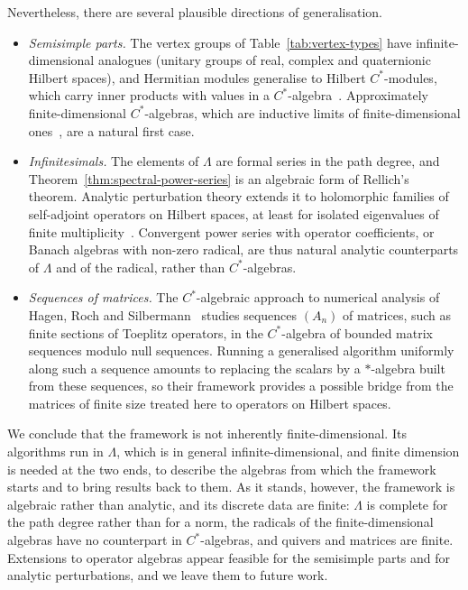 \documentclass[12pt, a4paper]{report}
\theoremstyle{plain}
\theoremstyle{definition}
\theoremstyle{remark}
\theoremstyle{plain}
\begin{document}
Nevertheless, there are several plausible directions of generalisation.
\begin{itemize}
  \item \emph{Semisimple parts.} The vertex groups of Table~\ref{tab:vertex-types} have infinite-dimensional analogues (unitary groups of real, complex and quaternionic Hilbert spaces), and Hermitian modules generalise to Hilbert $C^*$-modules, which carry inner products with values in a $C^*$-algebra~\cite{Lance1995}. Approximately finite-dimensional $C^*$-algebras, which are inductive limits of finite-dimensional ones~\cite{Davidson1996}, are a natural first case.
  \item \emph{Infinitesimals.} The elements of $\Lambda$ are formal series in the path degree, and Theorem~\ref{thm:spectral-power-series} is an algebraic form of Rellich's theorem. Analytic perturbation theory extends it to holomorphic families of self-adjoint operators on Hilbert spaces, at least for isolated eigenvalues of finite multiplicity~\cite{Kato1995}. Convergent power series with operator coefficients, or Banach algebras with non-zero radical, are thus natural analytic counterparts of $\Lambda$ and of the radical, rather than $C^*$-algebras.
  \item \emph{Sequences of matrices.} The $C^*$-algebraic approach to numerical analysis of Hagen, Roch and Silbermann~\cite{HagenRochSilbermann2001} studies sequences $(A_n)$ of matrices, such as finite sections of Toeplitz operators, in the $C^*$-algebra of bounded matrix sequences modulo null sequences. Running a generalised algorithm uniformly along such a sequence amounts to replacing the scalars by a $*$-algebra built from these sequences, so their framework provides a possible bridge from the matrices of finite size treated here to operators on Hilbert spaces.
\end{itemize}
We conclude that the framework is not inherently finite-dimensional. Its algorithms run in $\Lambda$, which is in general infinite-dimensional, and finite dimension is needed at the two ends, to describe the algebras from which the framework starts and to bring results back to them. As it stands, however, the framework is algebraic rather than analytic, and its discrete data are finite: $\Lambda$ is complete for the path degree rather than for a norm, the radicals of the finite-dimensional algebras have no counterpart in $C^*$-algebras, and quivers and matrices are finite. Extensions to operator algebras appear feasible for the semisimple parts and for analytic perturbations, and we leave them to future work.
\end{document}
